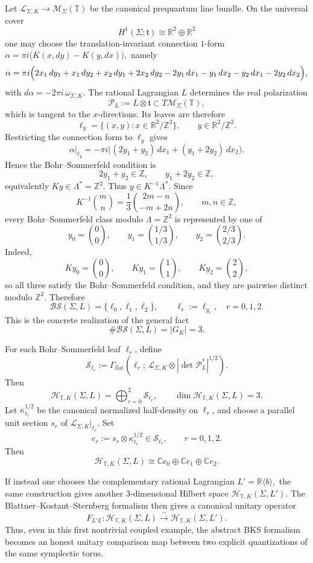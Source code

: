 \documentclass[12pt]{amsart}
\numberwithin{equation}{section}
\begin{document}
Let \(\mathcal L_{\Sigma,K}\rightarrow \mathcal M_\Sigma(\mathbb T)\) be the canonical prequantum line bundle. On the universal cover
\[
H^1(\Sigma;\mathfrak t)\cong \mathbb R^2\oplus\mathbb R^2
\]
one may choose the translation-invariant connection \(1\)-form $\alpha
=
\pi i\bigl(K(x,dy)-K(y,dx)\bigr),$
namely
\[
\alpha
=
\pi i\Bigl(
2x_1\,dy_1+x_1\,dy_2+x_2\,dy_1+2x_2\,dy_2
-2y_1\,dx_1-y_1\,dx_2-y_2\,dx_1-2y_2\,dx_2
\Bigr),
\]
with \(d\alpha=-2\pi i\,\omega_{\Sigma,K}.\) The rational Lagrangian \(L\) determines the real polarization
\[
\mathcal P_L:=L\otimes \mathfrak t\subset T\mathcal M_\Sigma(\mathbb T),
\]
which is tangent to the \(x\)-directions. Its leaves are therefore
\[
\ell_y=\{(x,y):x\in \mathbb R^2/\mathbb Z^2\},
\qquad
y\in \mathbb R^2/\mathbb Z^2.
\]
Restricting the connection form to \(\ell_y\) gives
\[
\alpha|_{\ell_y}
=
-\pi i\bigl((2y_1+y_2)\,dx_1+(y_1+2y_2)\,dx_2\bigr).
\]
Hence the Bohr--Sommerfeld condition is
\[
2y_1+y_2\in \mathbb Z,
\qquad
y_1+2y_2\in \mathbb Z,
\]
equivalently \(Ky\in \Lambda^*=\mathbb Z^2.\) Thus \(y\in K^{-1}\Lambda^*.\) Since
\[
K^{-1}\binom{m}{n}
=
\frac13
\binom{2m-n}{-m+2n},
\qquad m,n\in\mathbb Z,
\]
every Bohr--Sommerfeld class modulo \(\Lambda=\mathbb Z^2\) is represented by one of
\[
y_0=\binom00,
\qquad
y_1=\binom{1/3}{1/3},
\qquad
y_2=\binom{2/3}{2/3}.
\]
Indeed,
\[
Ky_0=\binom00,
\qquad
Ky_1=\binom11,
\qquad
Ky_2=\binom22,
\]
so all three satisfy the Bohr--Sommerfeld condition, and they are pairwise distinct modulo
\(\mathbb Z^2\). Therefore
\[
\mathcal{BS}(\Sigma,L)=\{\ell_0,\ell_1,\ell_2\},
\qquad
\ell_r:=\ell_{y_r},\quad r=0,1,2.
\]
This is the concrete realization of the general fact
\[
\# \mathcal{BS}(\Sigma,L)=|G_K|=3.
\]


For each Bohr--Sommerfeld leaf \(\ell_r\), define
\[
\mathcal S_{\ell_r}
:=
\Gamma_{\mathrm{flat}}
\!\left(
\ell_r;\,
\mathcal L_{\Sigma,K}\otimes |\det \mathcal P_L^*|^{1/2}
\right).
\]
Then
\[
\mathcal H_{\mathbb T,K}(\Sigma,L)
=
\bigoplus_{r=0}^2 \mathcal S_{\ell_r},
\qquad
\dim \mathcal H_{\mathbb T,K}(\Sigma,L)=3.
\]
Let \(\kappa^{1/2}_{\ell_r}\) be the canonical normalized half-density on \(\ell_r\), and choose
a parallel unit section \(s_r\) of \(\mathcal L_{\Sigma,K}|_{\ell_r}\). Set
\[
e_r:=s_r\otimes \kappa^{1/2}_{\ell_r}\in \mathcal S_{\ell_r},
\qquad r=0,1,2.
\]
Then
\[
\mathcal H_{\mathbb T,K}(\Sigma,L)
\cong
\mathbb C e_0\oplus \mathbb C e_1\oplus \mathbb C e_2.
\]

If instead one chooses the complementary rational Lagrangian \(L'=\mathbb R\langle b\rangle,\) the same construction gives another \(3\)-dimensional Hilbert space \(\mathcal H_{\mathbb T,K}(\Sigma,L').\)
The Blattner--Kostant--Sternberg formalism then gives a canonical unitary operator
\[
F_{L'L}:\mathcal H_{\mathbb T,K}(\Sigma,L)\xrightarrow{\ \sim\ }\mathcal H_{\mathbb T,K}(\Sigma,L').
\]
Thus, even in this first nontrivial coupled example, the abstract BKS formalism becomes
an honest unitary comparison map between two explicit quantizations of the same
symplectic torus.
\end{document}
